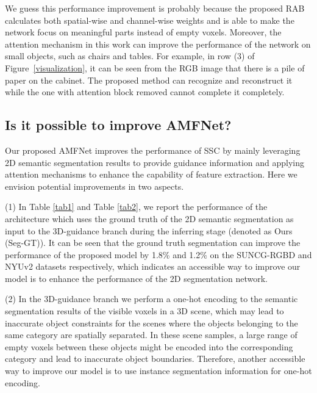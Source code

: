 \documentclass[letterpaper]{article} \usepackage{aaai20}  \usepackage{times}  \usepackage{helvet} \usepackage{courier}  \usepackage[hyphens]{url}  \usepackage{graphicx} \urlstyle{rm} \def\UrlFont{\rm}  \usepackage{graphicx}  \frenchspacing  \setlength{\pdfpagewidth}{8.5in}  \setlength{\pdfpageheight}{11in}
\begin{document}
We guess this performance improvement is probably because the proposed RAB calculates both spatial-wise and channel-wise weights and is able to make the network focus on meaningful parts instead of empty voxels. 
Moreover, the attention mechanism in this work can improve the performance of the network on small objects, such as chairs and tables. For example, in row (3) of Figure~\ref{visualization}, it can be seen from the RGB image that there is a pile of paper on the cabinet. 
The proposed method can recognize and reconstruct it while the one with attention block removed cannot complete it completely.


\subsection{Is it possible to improve AMFNet?}

Our proposed AMFNet improves the performance of SSC by mainly leveraging 2D semantic segmentation results to provide guidance information and applying attention mechanisms to enhance the capability of feature extraction. Here we envision potential improvements in two aspects. 

(1) In Table \ref{tab1} and Table \ref{tab2}, we report the performance of the architecture which uses the ground truth of the 2D semantic segmentation as input to the 3D-guidance branch during the inferring stage (denoted as Ours (Seg-GT)). It can be seen that the ground truth segmentation can improve the performance of the proposed model by 1.8\% and 1.2\% on the SUNCG-RGBD and NYUv2 datasets respectively, which indicates an accessible way to improve our model is to enhance the performance of the 2D segmentation network. 

(2) In the 3D-guidance branch we perform a one-hot encoding to the semantic segmentation results of the visible voxels in a 3D scene, which may lead to inaccurate object constraints for the scenes where the objects belonging to the same category are spatially separated. In these scene samples, a large range of empty voxels between these objects might be encoded into the corresponding category and lead to inaccurate object boundaries. Therefore, another accessible way to improve our model is to use instance segmentation information for one-hot encoding.
\end{document}
